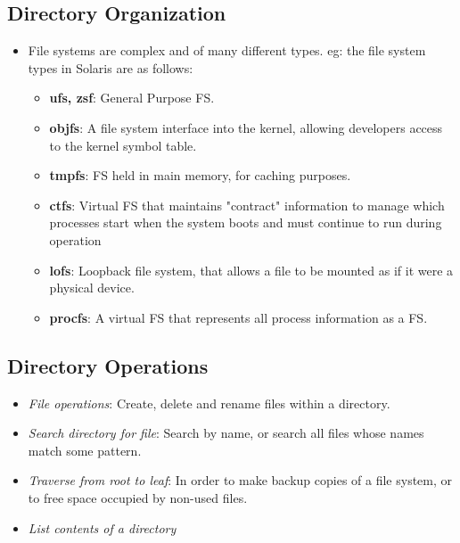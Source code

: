 \documentclass{article}
\theoremstyle{plain}
\theoremstyle{definition}
\begin{document}
\subsection{Directory Organization}
\begin{itemize}
    \item File systems are complex and of many different types. eg: the file system types in Solaris are as follows:
    
    \begin{itemize}
        \item \textbf{ufs, zsf}: General Purpose FS.
        
        \item \textbf{objfs}: A file system interface into the kernel, allowing developers access to the kernel symbol table.
        
        \item \textbf{tmpfs}: FS held in main memory, for caching purposes. 
        
        \item \textbf{ctfs}: Virtual FS that maintains "contract" information to manage which processes start when the system boots and must continue to run during operation
        
        \item \textbf{lofs}: Loopback file system, that allows a file to be mounted as if it were a physical device. 
        
        \item \textbf{procfs}: A virtual FS that represents all process information as a FS.
    \end{itemize}
\end{itemize}

\subsection{Directory Operations}
\begin{itemize}
    \item \textit{File operations}: Create, delete and rename files within a directory.
    
    \item \textit{Search directory for file}: Search by name, or search all files whose names match some pattern. 
    
    \item \textit{Traverse from root to leaf}: In order to make backup copies of a file system, or to free space occupied by non-used files.
    
    \item \textit{List contents of a directory}
\end{itemize}
\end{document}
